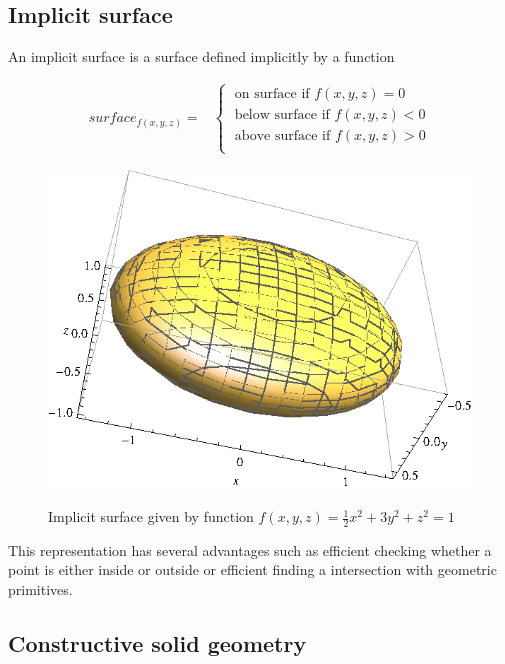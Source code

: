 \subsection{Implicit surface}
An implicit surface is a surface defined implicitly by a function

\begin{equation}
\begin{split}
surface_{f(x,y,z)} =
  &\left\{\;
    \begin{split}
      \text{on surface if }f(x,y,z) = 0 \\ 
      \text{below surface if }f(x,y,z) < 0 \\
      \text{above surface if }f(x,y,z) > 0 \\
    \end{split}
  \right.
\end{split}
\end{equation}

\begin{figure}[H]
\centering
\includegraphics[scale=1]{../img/implicit_surface.eps}
\label{fig:implicit}
\caption{Implicit surface given by function $f(x,y,z) = \frac{1}{2}x^{2} + 3y^{2} + z^{2} = 1$}
\end{figure}


This representation has several advantages such as efficient checking whether a point is either
inside or outside or efficient finding a intersection with geometric primitives.


\subsection{Constructive solid geometry}

